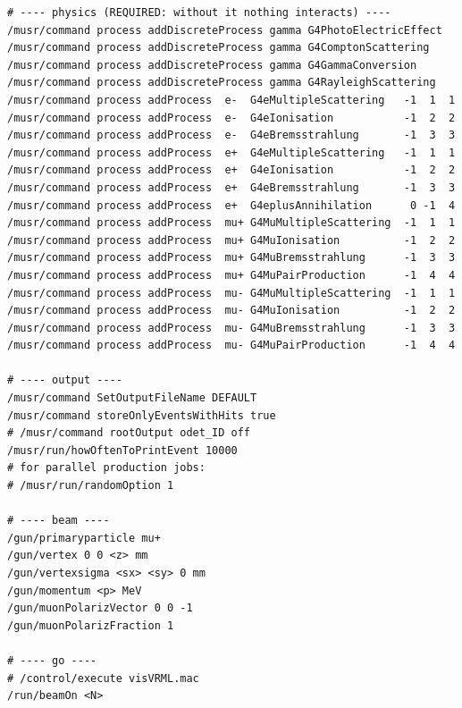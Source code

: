 \begin{lstlisting}[style=mac,caption={A reusable starting point for a new simulation}]
# ---- physics (REQUIRED: without it nothing interacts) ----
/musr/command process addDiscreteProcess gamma G4PhotoElectricEffect
/musr/command process addDiscreteProcess gamma G4ComptonScattering
/musr/command process addDiscreteProcess gamma G4GammaConversion
/musr/command process addDiscreteProcess gamma G4RayleighScattering
/musr/command process addProcess  e-  G4eMultipleScattering   -1  1  1
/musr/command process addProcess  e-  G4eIonisation           -1  2  2
/musr/command process addProcess  e-  G4eBremsstrahlung       -1  3  3
/musr/command process addProcess  e+  G4eMultipleScattering   -1  1  1
/musr/command process addProcess  e+  G4eIonisation           -1  2  2
/musr/command process addProcess  e+  G4eBremsstrahlung       -1  3  3
/musr/command process addProcess  e+  G4eplusAnnihilation      0 -1  4
/musr/command process addProcess  mu+ G4MuMultipleScattering  -1  1  1
/musr/command process addProcess  mu+ G4MuIonisation          -1  2  2
/musr/command process addProcess  mu+ G4MuBremsstrahlung      -1  3  3
/musr/command process addProcess  mu+ G4MuPairProduction      -1  4  4
/musr/command process addProcess  mu- G4MuMultipleScattering  -1  1  1
/musr/command process addProcess  mu- G4MuIonisation          -1  2  2
/musr/command process addProcess  mu- G4MuBremsstrahlung      -1  3  3
/musr/command process addProcess  mu- G4MuPairProduction      -1  4  4

# ---- output ----
/musr/command SetOutputFileName DEFAULT
/musr/command storeOnlyEventsWithHits true
# /musr/command rootOutput odet_ID off
/musr/run/howOftenToPrintEvent 10000
# for parallel production jobs:
# /musr/run/randomOption 1

# ---- beam ----
/gun/primaryparticle mu+
/gun/vertex 0 0 <z> mm
/gun/vertexsigma <sx> <sy> 0 mm
/gun/momentum <p> MeV
/gun/muonPolarizVector 0 0 -1
/gun/muonPolarizFraction 1

# ---- go ----
# /control/execute visVRML.mac
/run/beamOn <N>
\end{lstlisting}
